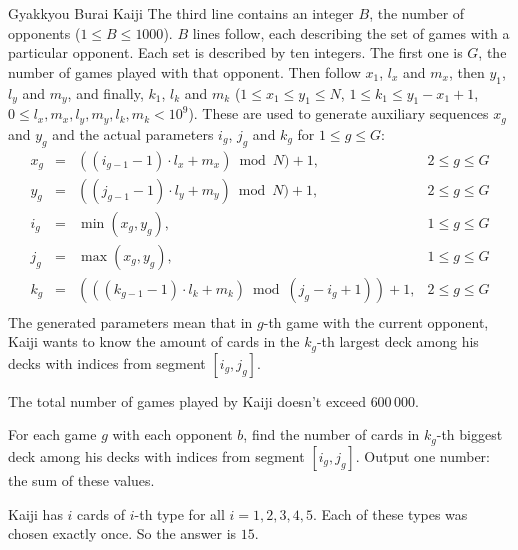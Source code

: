 \begin{problem}{Gyakkyou Burai Kaiji}
The third line contains an integer $B$,
the number of opponents ($1 \leq B \leq 1000$).
$B$ lines follow, each describing the set of games with a particular opponent.
Each set is described by ten integers.
The first one is $G$, the number of games played with that opponent.
Then follow $x_1$, $l_x$ and $m_x$, then $y_1$, $l_y$ and $m_y$,
and finally, $k_1$, $l_k$ and $m_k$
($1 \leq x_1 \leq y_1 \leq N$, $1 \leq k_1 \leq y_1 - x_1 + 1$,
$0 \leq l_x, m_x, l_y, m_y, l_k, m_k < 10^9$).
These are used to generate auxiliary sequences $x_g$ and $y_g$ and
the actual parameters $i_g$, $j_g$ and $k_g$ for $1 \leq g \leq G$:
$$
\begin{array}{ccll}
x_g & = & ((i_{g - 1} - 1) \cdot l_x + m_x) \bmod N) + 1, & 2 \leq g \leq G \\
y_g & = & ((j_{g - 1} - 1) \cdot l_y + m_y) \bmod N) + 1, & 2 \leq g \leq G \\
i_g & = & \min(x_g, y_g), & 1 \leq g \leq G \\
j_g & = & \max(x_g, y_g), & 1 \leq g \leq G \\
k_g & = & (((k_{g - 1} - 1) \cdot l_k + m_k) \bmod (j_g - i_g + 1)) + 1,
& 2 \leq g \leq G \\
\end{array}
$$
The generated parameters mean that in $g$-th game with the current opponent,
Kaiji wants to know the amount of cards in the $k_g$-th largest deck among
his decks with indices from segment $[i_g, j_g]$.

The total number of games played by Kaiji doesn't exceed $600\,000$.

\OutputFile

For each game $g$ with each opponent $b$, find the number of cards in $k_g$-th
biggest deck among his decks with indices from segment $[i_g, j_g]$.
Output one number: the sum of these values.

\Example

\begin{example}
%
\end{example}

\medskip

Kaiji has $i$ cards of $i$-th type for all $i = 1, 2, 3, 4, 5$.
Each of these types was chosen exactly once.
So the answer is $15$.

\end{problem}
